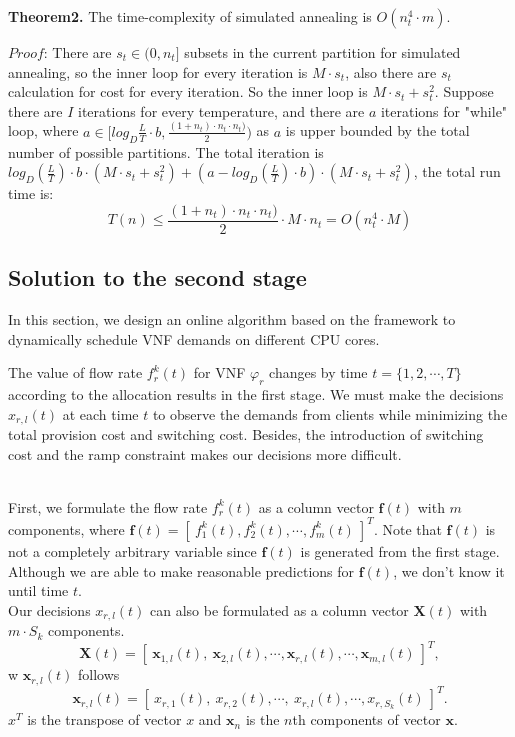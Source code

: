 \documentclass{acmtog}
\begin{document}
\noindent\textbf{Theorem2.} The time-complexity of simulated annealing is $O(n_t^4 \cdot m)$.

\noindent $Proof$: There are  $s_t \in (0,n_t]$ subsets in the current partition for simulated annealing, so the inner loop for every iteration is $M \cdot s_t$, also there are $s_t$ calculation for cost for every iteration. So the inner loop is $M \cdot s_t + s_t^2$. Suppose there are $I$ iterations for every temperature, and there are $a$ iterations for "while" loop, where $a \in [log_{D}\frac{L}{T} \cdot b, \frac{(1+n_t) \cdot n_t \cdot n_t)}{2})$ as $a$ is upper bounded by the total number of possible partitions. The total iteration is $log_{D}(\frac{L}{T}) \cdot b \cdot (M \cdot s_t + s_t^2) + (a - log_{D}(\frac{L}{T}) \cdot b)\cdot (M \cdot s_t + s_t^2) $, the total run time is:
$$
T(n) \leq \frac{(1+n_t) \cdot n_t \cdot n_t)}{2} \cdot M \cdot n_t = O( n_t^4 \cdot M)
$$


\subsection{Solution to the second stage}
In this section, we design an online algorithm based on the framework\cite{c3} to dynamically schedule VNF demands on different CPU cores.

The value of flow rate $f_r^k(t)$ for VNF $\varphi_r$ changes by time $t=\{1,2,\cdots,T\}$ according to the allocation results in the first stage. We must make the decisions $x_{r,l}(t)$ at each time $t$ to observe the demands from clients while minimizing the total provision cost and switching cost. Besides, the introduction of switching cost and the ramp constraint makes our decisions more difficult. 

\\First, we formulate the flow rate $f_r^k(t)$ as a column vector $\bm{f}(t)$ with $m$ components, where $\bm{f}(t) =[~f_1^k(t),f_2^k(t),\cdots,f_m^k(t)~]^T.$
Note that $\bm{f}(t)$ is not a completely arbitrary variable since $\bm{f}(t)$ is generated from the first stage. Although we are able to make reasonable predictions for $\bm{f}(t)$, we don't know it until time $t$. 
\\\indent Our decisions $x_{r,l}(t)$ can also be formulated as a column vector $\bm{X}(t)$ with $m\cdot S_k$ components.
\begin{equation}\label{XVector1}
  \bm{X}(t)=[~\bm{x}_{1,l}(t), ~\bm{x}_{2,l}(t),\cdots ,\bm{x}_{r,l}(t),\cdots,\bm{x}_{m,l}(t)~]^T,
\end{equation}
w $\bm{x}_{r,l}(t)$ follows
\begin{equation}\label{XVector2}
  \bm{x}_{r,l}(t)=[~x_{r,1}(t),~x_{r,2}(t),\cdots,~x_{r,l}(t),\cdots,x_{r,S_k}(t)~]^T.
\end{equation}
\boldmath$x$\unboldmath${}^T$ is the transpose of vector \boldmath $x$ \unboldmath and $\bm{x}_n$ is the $n$th components of vector $\bm{x}$.
\end{document}
